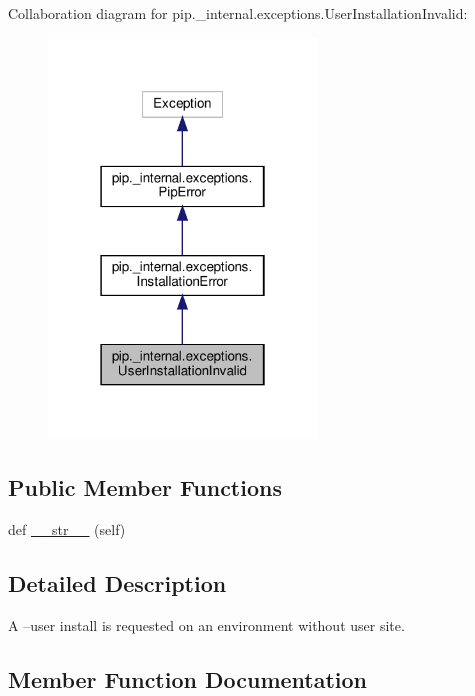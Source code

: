 Collaboration diagram for pip.\+\_\+internal.\+exceptions.\+User\+Installation\+Invalid\+:
\nopagebreak
\begin{figure}[H]
\begin{center}
\leavevmode
\includegraphics[width=202pt]{classpip_1_1__internal_1_1exceptions_1_1UserInstallationInvalid__coll__graph}
\end{center}
\end{figure}
\subsection*{Public Member Functions}
\begin{DoxyCompactItemize}
\item 
def \hyperlink{classpip_1_1__internal_1_1exceptions_1_1UserInstallationInvalid_abb2dbc4187aea1f44998d92465e2e9c4}{\+\_\+\+\_\+str\+\_\+\+\_\+} (self)
\end{DoxyCompactItemize}


\subsection{Detailed Description}
\begin{DoxyVerb}A --user install is requested on an environment without user site.\end{DoxyVerb}
 

\subsection{Member Function Documentation}
\mbox{\label{classpip_1_1__internal_1_1exceptions_1_1UserInstallationInvalid_abb2dbc4187aea1f44998d92465e2e9c4}} 
